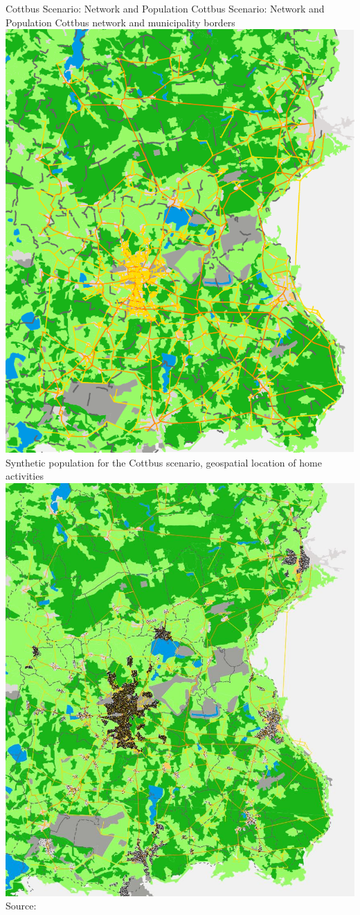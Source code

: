 \createfigure%
{Cottbus Scenario: Network and Population}%
{Cottbus Scenario: Network and Population}%
{\label{fig:cottbus_network_population}}%
{%
  \createsubfigure%
	{Cottbus network and municipality borders}
	{\includegraphics[width=0.49\linewidth]{./using/figures/2013_network_gemeinden_landuse_edit.pdf}}
	{\label{fig:network_municipalities_cottbus_landuse}}
  \createsubfigure%
	{Synthetic population for the Cottbus scenario, geospatial location of home activities}
	{\includegraphics[width=0.49\linewidth]{./using/figures/2013_network_gemeinden_landuse_population_home.jpg}}
	{\label{fig:cottbus_population_home}}
}%
{Source:~\citet{Grether2014PhD}} 

